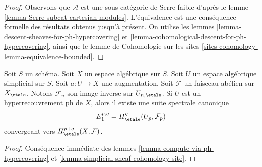 \begin{proof}
Observons que $\mathcal{A}$ est une sous-catégorie de Serre faible d'après le
lemme \ref{lemma-Serre-subcat-cartesian-modules}.
L'équivalence est une conséquence formelle
des résultats obtenus jusqu'à présent. On utilise les lemmes
\ref{lemma-descent-sheaves-for-ph-hypercovering} et
\ref{lemma-cohomological-descent-for-ph-hypercovering}, ainsi que le lemme de Cohomologie
sur les sites \ref{sites-cohomology-lemma-equivalence-bounded}.
\end{proof}

\begin{lemma}
\label{lemma-spectral-sequence-ph-hypercovering}
Soit $S$ un schéma. Soit $X$ un espace algébrique sur $S$.
Soit $U$ un espace algébrique simplicial sur $S$. Soit $a : U \to X$
une augmentation. Soit $\mathcal{F}$ un faisceau abélien
sur $X_\etale$. Notons $\mathcal{F}_n$ son image inverse sur $U_{n, \etale}$.
Si $U$ est un hyperrecouvrement ph de $X$, alors
il existe une suite spectrale canonique
$$
E_1^{p, q} = H^q_\etale(U_p, \mathcal{F}_p)
$$
convergeant vers $H^{p + q}_\etale(X, \mathcal{F})$.
\end{lemma}

\begin{proof}
Conséquence immédiate des lemmes \ref{lemma-compute-via-ph-hypercovering}
et \ref{lemma-simplicial-sheaf-cohomology-site}.
\end{proof}
















